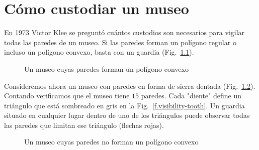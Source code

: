 
\chapter{Cómo custodiar un museo}\label{c.museum}


En 1973 Victor Klee se preguntó cuántos custodios son necesarios para vigilar todas las paredes de un museo. Si las paredes forman un polígono regular o incluso un polígono convexo, basta con un guardia (Fig.~\ref{f.museum.convex}).
\begin{figure}[ht]
\begin{center}
\end{center}
\caption{Un museo cuyas paredes forman un polígono convexo}\label{f.museum.convex}
\end{figure}

Consideremos ahora un museo con paredes en forma de sierra dentada (Fig.~\ref{f.museum.nonconvex}). Contando verificamos que el museo tiene $15$ paredes. Cada "diente" define un triángulo que está sombreado en gris en la Fig.~\ref{f.visibility-tooth}. Un guardia situado en cualquier lugar dentro de uno de los triángulos puede observar todas las paredes que limitan ese triángulo (flechas rojas).
\begin{figure}[b]
\begin{center}
\end{center}
\caption{Un museo cuyas paredes no forman un polígono convexo}\label{f.museum.nonconvex}
\end{figure}

